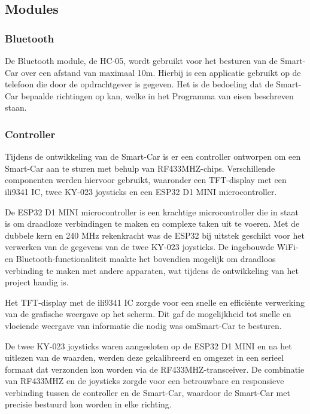 \subsection{Modules}
\subsubsection{Bluetooth}
De \gls{Bluetooth} module, de HC-05, wordt gebruikt voor het besturen van de \gls{Smart-Car} over een afstand van maximaal 10m. Hierbij is een applicatie gebruikt op de telefoon die door de opdrachtgever is gegeven. Het is de bedoeling dat de \gls{Smart-Car} bepaalde richtingen op kan, welke in het Programma van eisen beschreven staan. 
\subsubsection{Controller}
Tijdens de ontwikkeling van de \gls{Smart-Car} is er een controller ontworpen om een \gls{Smart-Car} aan te sturen met behulp van \gls{RF433MHZ}-chips. Verschillende componenten werden hiervoor gebruikt, waaronder een \gls{TFT-display} met een \gls{ili9341}\cite{ILI3941} IC, twee KY-023 joysticks en een ESP32\cite{ESP32} D1 MINI \gls{microcontroller}.

De ESP32\cite{ESP32} D1 MINI \gls{microcontroller} is een krachtige \gls{microcontroller} die in staat is om draadloze verbindingen te maken en complexe taken uit te voeren. Met de dubbele kern en 240 MHz rekenkracht was de ESP32\cite{ESP32} bij uitstek geschikt voor het verwerken van de gegevens van de twee KY-023 joysticks. De ingebouwde WiFi- en \gls{Bluetooth}-functionaliteit maakte het bovendien mogelijk om draadloos verbinding te maken met andere apparaten, wat tijdens de ontwikkeling van het project handig is.

Het \gls{TFT-display} met de \gls{ili9341}\cite{ILI3941} IC zorgde voor een snelle en efficiënte verwerking van de grafische weergave op het scherm. Dit gaf de mogelijkheid tot snelle en vloeiende weergave van informatie die nodig was om\gls{Smart-Car} te besturen.

De twee KY-023\cite{KY023} joysticks waren aangesloten op de ESP32\cite{ESP32} D1 MINI en na het uitlezen van de waarden, werden deze gekalibreerd en omgezet in een serieel formaat dat verzonden kon worden via de \gls{RF433MHZ}-transceiver. De combinatie van \gls{RF433MHZ} en de joysticks zorgde voor een betrouwbare en responsieve verbinding tussen de controller en de \gls{Smart-Car}, waardoor de \gls{Smart-Car} met precisie bestuurd kon worden in elke richting.

